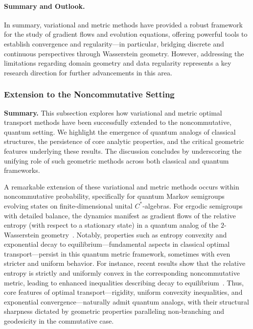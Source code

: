 \documentclass[sigconf]{acmart}
\begin{document}
\paragraph{Summary and Outlook.} In summary, variational and metric methods have provided a robust framework for the study of gradient flows and evolution equations, offering powerful tools to establish convergence and regularity—in particular, bridging discrete and continuous perspectives through Wasserstein geometry. However, addressing the limitations regarding domain geometry and data regularity represents a key research direction for further advancements in this area.

\subsubsection{Extension to the Noncommutative Setting}

\textbf{Summary.} This subsection explores how variational and metric optimal transport methods have been successfully extended to the noncommutative, quantum setting. We highlight the emergence of quantum analogs of classical structures, the persistence of core analytic properties, and the critical geometric features underlying these results. The discussion concludes by underscoring the unifying role of such geometric methods across both classical and quantum frameworks.

A remarkable extension of these variational and metric methods occurs within noncommutative probability, specifically for quantum Markov semigroups evolving states on finite-dimensional unital $C^*$-algebras. For ergodic semigroups with detailed balance, the dynamics manifest as gradient flows of the relative entropy (with respect to a stationary state) in a quantum analog of the $2$-Wasserstein geometry~\cite{ref97}. Notably, properties such as entropy convexity and exponential decay to equilibrium—fundamental aspects in classical optimal transport—persist in this quantum metric framework, sometimes with even stricter and uniform behavior. For instance, recent results show that the relative entropy is strictly and uniformly convex in the corresponding noncommutative metric, leading to enhanced inequalities describing decay to equilibrium~\cite{ref97}. Thus, core features of optimal transport—rigidity, uniform convexity inequalities, and exponential convergence—naturally admit quantum analogs, with their structural sharpness dictated by geometric properties paralleling non-branching and geodesicity in the commutative case.
\end{document}

